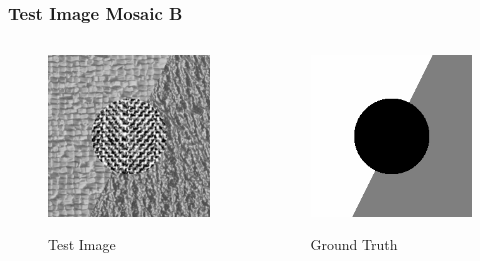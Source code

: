 \documentclass[11pt]{beamer}
\begin{document}
\begin{frame}
\frametitle{Test Image Mosaic B}
\begin{columns}[onlytextwidth]
\begin{column}{.45\textwidth}
\begin{figure}
  \colorbox{gray!20}{\includegraphics[width=.9\textwidth]{mosaicB.png}}
  \caption{Test Image}
\end{figure}
\end{column}
\hfill
\begin{column}{.45\textwidth}
\begin{figure}
  \colorbox{gray!20}{\includegraphics[width=.9\textwidth]{mapB.png}}
  \caption{Ground Truth}
\end{figure}
\end{column}
\end{columns}
\end{frame}
\end{document}
